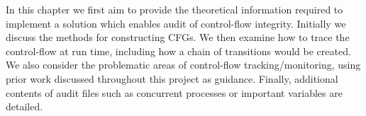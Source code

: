 In this chapter we first aim to provide the theoretical information required to implement a solution which enables audit of control-flow integrity. Initially we discuss the methods for constructing CFGs. We then examine how to trace the control-flow at run time, including how a chain of transitions would be created. We also consider the problematic areas of control-flow tracking\slash monitoring, using prior work discussed throughout this project as guidance. Finally, additional contents of audit files such as concurrent processes or important variables are detailed.